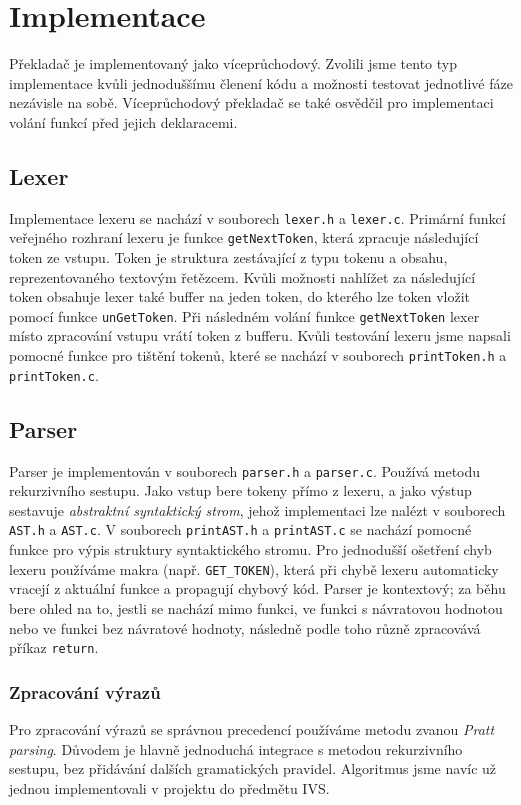 \section{Implementace}
Překladač je implementovaný jako víceprůchodový.
Zvolili jsme tento typ implementace kvůli jednoduššímu členení kódu a možnosti testovat jednotlivé fáze nezávisle na sobě.
Víceprůchodový překladač se také osvědčil pro implementaci volání funkcí před jejich deklaracemi.

\subsection{Lexer}
Implementace lexeru se nachází v souborech \texttt{lexer.h} a \texttt{lexer.c}.
Primární funkcí veřejného rozhraní lexeru je funkce \texttt{getNextToken},
která zpracuje následující token ze vstupu.
Token je struktura zestávající z typu tokenu a obsahu, reprezentovaného textovým řetězcem.
Kvůli možnosti nahlížet za následující token obsahuje lexer také buffer na jeden token,
do kterého lze token vložit pomocí funkce \texttt{unGetToken}.
Při následném volání funkce \texttt{getNextToken} lexer místo zpracování vstupu vrátí token z bufferu.
Kvůli testování lexeru jsme napsali pomocné funkce pro tištění tokenů,
které se nachází v souborech \texttt{printToken.h} a \texttt{printToken.c}.

\subsection{Parser}
Parser je implementován v souborech \texttt{parser.h} a \texttt{parser.c}.
Používá metodu rekurzivního sestupu.
Jako vstup bere tokeny přímo z lexeru, a jako výstup sestavuje \textit{abstraktní syntaktický strom},
jehož implementaci lze nalézt v souborech \texttt{AST.h} a \texttt{AST.c}.
V souborech \texttt{printAST.h} a \texttt{printAST.c} se nachází pomocné funkce pro výpis struktury syntaktického stromu.
Pro jednodušší ošetření chyb lexeru používáme makra (např. \texttt{GET\_TOKEN}),
která při chybě lexeru automaticky vracejí z aktuální funkce a propagují chybový kód.
Parser je kontextový; za běhu bere ohled na to, jestli se nachází mimo funkci,
ve funkci s návratovou hodnotou nebo ve funkci bez návratové hodnoty,
následně podle toho různě zpracovává příkaz \texttt{return}.

\subsubsection{Zpracování výrazů}
Pro zpracování výrazů se správnou precedencí používáme metodu zvanou \textit{Pratt parsing}.
Důvodem je hlavně jednoduchá integrace s metodou rekurzivního sestupu, bez přidávání dalších gramatických pravidel.
Algoritmus jsme navíc už jednou implementovali v projektu do předmětu IVS.

